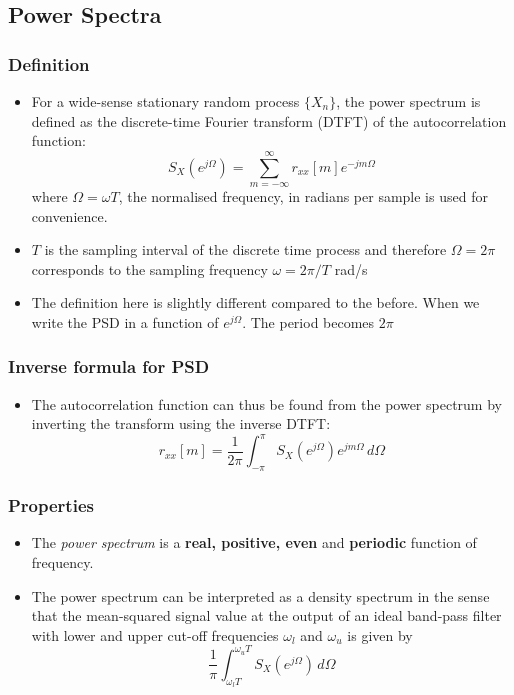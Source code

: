 \documentclass[12pt]{article}
\newcommand{\empha}[1]{\textbf{\textcolor{blue1}{#1}}}
\newcommand{\titc}[1]{\textit{\textcolor{blue1}{#1}}}
\newcommand{\intpipi}{\int_{-\pi}^{\pi}}
\newcommand{\summ}[2]{\sum_{#1}^{#2}}
\newcommand{\summinfinf}{\summ{m=-\infty}{\infty}}
\newcommand{\proc}[1]{\{ #1_n\}}
\newcommand{\ps}{S_X}
\newcommand{\autocox}{r_{xx}}
\begin{document}
\subsection{Power Spectra}
\subsubsection{Definition}
\begin{itemize}

\item For a wide-sense stationary random process $\proc{X}$, the power spectrum is defined as the discrete-time Fourier transform (DTFT) of the autocorrelation function:
\[
\ps(e^{j\Omega}) = \summinfinf \autocox[m]e^{-jm\Omega}
\]
where $\Omega = \omega T$, the normalised frequency, in radians per sample is used for convenience.
    \item $T$ is the sampling interval of the discrete time process and therefore $\Omega  = 2\pi$ corresponds to the sampling frequency $\omega = 2\pi / T$ rad/s
    \item The definition here is slightly different compared to the before. When we write the PSD in a function of $e^{j\Omega}$. The period becomes $2\pi$
\end{itemize}
\subsubsection{Inverse formula for PSD}
\begin{itemize}
    \item The autocorrelation function can thus be found from the power spectrum by inverting the transform using the inverse DTFT:
    \[
    \autocox[m] = \frac{1}{2\pi} \intpipi \ps(e^{j\Omega})e^{jm\Omega} \, d\Omega
    \]
\end{itemize}
\subsubsection{Properties}
\begin{itemize}
    \item The \titc{power spectrum} is a \empha{real, positive, even} and \empha{periodic} function of frequency.
    \item The power spectrum can be interpreted as a density spectrum in the sense that the mean-squared signal value at the output of an ideal band-pass filter with lower and upper cut-off frequencies $\omega_l$ and $\omega_u$ is given by
    \[
    \frac{1}{\pi}\int_{\omega_l T}^{\omega_u T} \ps(e^{j\Omega}) \, d\Omega
    \]
    
\end{itemize}
\end{document}
